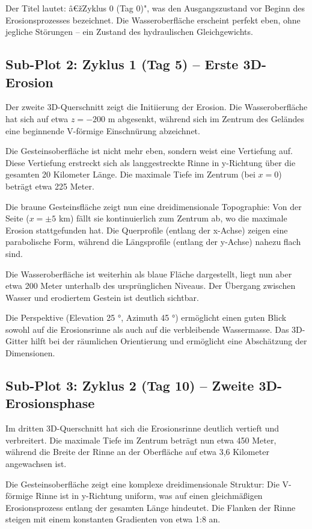 ﻿\documentclass[12pt,a4paper]{report}
\begin{document}
Der Titel lautet: â€žZyklus 0 (Tag 0)", was den Ausgangszustand vor Beginn des Erosionsprozesses bezeichnet. Die Wasseroberfläche erscheint perfekt eben, ohne jegliche Stö\-rungen -- ein Zustand des hydraulischen Gleichgewichts.

\subsection{Sub-Plot 2: Zyklus 1 (Tag 5) -- Erste 3D-Erosion}

Der zweite 3D-Querschnitt zeigt die Initiierung der Erosion. Die Wasseroberfläche hat sich auf etwa $z = -200$ m abgesenkt, während sich im Zentrum des Geländes eine beginnende V-förmige Einschnürung abzeichnet.

Die Gesteinsoberfläche ist nicht mehr eben, sondern weist eine Vertiefung auf. Diese Vertiefung erstreckt sich als langgestreckte Rinne in y-Richtung über die gesamten 20 Kilometer Länge. Die maximale Tiefe im Zentrum (bei $x = 0$) beträgt etwa 225 Meter.

Die braune Gesteinsfläche zeigt nun eine dreidimensionale Topographie: Von der Seite ($x = \pm 5$ km) fällt sie kontinuierlich zum Zentrum ab, wo die maximale Erosion stattgefunden hat. Die Querprofile (entlang der x-Achse) zeigen eine parabolische Form, während die Längsprofile (entlang der y-Achse) nahezu flach sind.

Die Wasseroberfläche ist weiterhin als blaue Fläche dargestellt, liegt nun aber etwa 200 Meter unterhalb des ursprünglichen Niveaus. Der Übergang zwischen Wasser und erodiertem Gestein ist deutlich sichtbar.

Die Perspektive (Elevation 25 °, Azimuth 45 °) ermöglicht einen guten Blick sowohl auf die Erosionsrinne als auch auf die verbleibende Wassermasse. Das 3D-Gitter hilft bei der räumlichen Orientierung und ermöglicht eine Abschätzung der Dimensionen.

\subsection{Sub-Plot 3: Zyklus 2 (Tag 10) -- Zweite 3D-Erosionsphase}

Im dritten 3D-Querschnitt hat sich die Erosionsrinne deutlich vertieft und verbreitert. Die maximale Tiefe im Zentrum beträgt nun etwa 450 Meter, während die Breite der Rinne an der Oberfläche auf etwa 3,6 Kilometer angewachsen ist.

Die Gesteinsoberfläche zeigt eine komplexe dreidimensionale Struktur: Die V-förmige Rinne ist in y-Richtung uniform, was auf einen gleichmäßigen Erosionsprozess entlang der gesamten Länge hindeutet. Die Flanken der Rinne steigen mit einem konstanten Gradienten von etwa 1:8 an.
\end{document}
